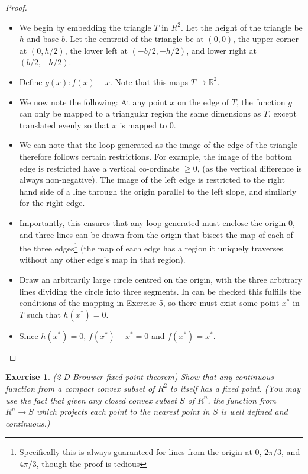 \documentclass[12pt]{article}
\newtheorem{exercise}{Exercise}
\newcommand{\R}{\mathbb{R}}
\begin{document}
\begin{proof}
    \begin{itemize}
        \item We begin by embedding the triangle $T$ in $R^2$. Let the height of the triangle be $h$ and base $b$. Let the centroid of the triangle be at $(0, 0)$, the upper corner at $(0, h/2)$, the lower left at $(-b/2,-h/2)$, and lower right at $(b/2,-h/2)$.
        \item Define $g(x): f(x)-x$. Note that this maps $T \to \R^2$.
        \item We now note the following: At any point $x$ on the edge of $T$, the function $g$ can only be mapped to a triangular region the same dimensions as $T$, except translated evenly so that $x$ is mapped to $0$.
        \item We can note that the loop generated as the image of the edge of the triangle therefore follows certain restrictions. For example, the image of the bottom edge is restricted have a vertical co-ordinate $\geq 0$, (as the vertical difference is always non-negative). The image of the left edge is restricted to the right hand side of a line through the origin parallel to the left slope, and similarly for the right edge.
        \item Importantly, this ensures that any loop generated must enclose the origin $0$, and three lines can be drawn from the origin that bisect the map of each of the three edges\footnote{Specifically this is always guaranteed for lines from the origin at $0$, $2\pi/3$, and $4\pi/3$, though the proof is tedious} (the map of each edge has a region it uniquely traverses without any other edge's map in that region).
        \item Draw an arbitrarily large circle centred on the origin, with the three arbitrary lines dividing the circle into three segments. In can be checked this fulfills the conditions of the mapping in Exercise 5, so there must exist some point $x^*$ in $T$ such that $h(x^*) = 0$.
        \item Since $h(x^*) = 0$, $f(x^*) - x^* = 0$ and $f(x^*) = x^*$.
    \end{itemize}
\end{proof}

\begin{exercise}
    (2-D Brouwer fixed point theorem) Show that any continuous function from a compact convex subset of $R^2$ to itself has a fixed point. (You may use the fact that given any closed convex subset $S$ of $R^n$, the function from $R^n \to S$ which projects each point to the nearest point in $S$ is well defined and continuous.)
\end{exercise}
\end{document}
